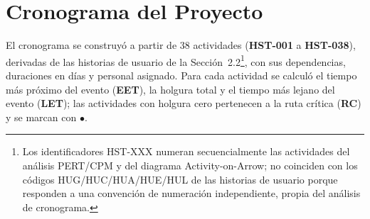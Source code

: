 \section{Cronograma del Proyecto}
\label{sec:cronograma-a}

El cronograma se construyó a partir de 38 actividades (\textbf{HST-001} a \textbf{HST-038}), derivadas de las historias de usuario de la Sección~2.2\footnote{Los identificadores HST-XXX numeran secuencialmente las actividades del análisis PERT/CPM y del diagrama Activity-on-Arrow; no coinciden con los códigos HUG/HUC/HUA/HUE/HUL de las historias de usuario porque responden a una convención de numeración independiente, propia del análisis de cronograma.}, con sus dependencias, duraciones en días y personal asignado. Para cada actividad se calculó el tiempo más próximo del evento (\textbf{EET}), la holgura total y el tiempo más lejano del evento (\textbf{LET}); las actividades con holgura cero pertenecen a la ruta crítica (\textbf{RC}) y se marcan con $\bullet$.

